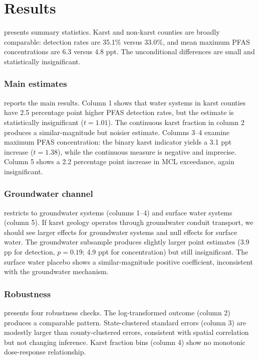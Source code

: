 \documentclass[12pt]{article}
\begin{document}
\section{Results}

 presents summary statistics. Karst and non-karst counties are broadly comparable: detection rates are 35.1\% versus 33.0\%, and mean maximum PFAS concentrations are 6.3 versus 4.8 ppt. The unconditional differences are small and statistically insignificant.



\subsubsection*{Main estimates}  reports the main results. Column 1 shows that water systems in karst counties have 2.5 percentage point higher PFAS detection rates, but the estimate is statistically insignificant ($t = 1.01$). The continuous karst fraction in column 2 produces a similar-magnitude but noisier estimate. Columns 3--4 examine maximum PFAS concentration: the binary karst indicator yields a 3.1 ppt increase ($t = 1.38$), while the continuous measure is negative and imprecise. Column 5 shows a 2.2 percentage point increase in MCL exceedance, again insignificant.



\subsubsection*{Groundwater channel}  restricts to groundwater systems (columns 1--4) and surface water systems (column 5). If karst geology operates through groundwater conduit transport, we should see larger effects for groundwater systems and null effects for surface water. The groundwater subsample produces slightly larger point estimates (3.9 pp for detection, $p = 0.19$; 4.9 ppt for concentration) but still insignificant. The surface water placebo shows a similar-magnitude positive coefficient, inconsistent with the groundwater mechanism.



\subsubsection*{Robustness}  presents four robustness checks. The log-transformed outcome (column 2) produces a comparable pattern. State-clustered standard errors (column 3) are modestly larger than county-clustered errors, consistent with spatial correlation but not changing inference. Karst fraction bins (column 4) show no monotonic dose-response relationship.
\end{document}
